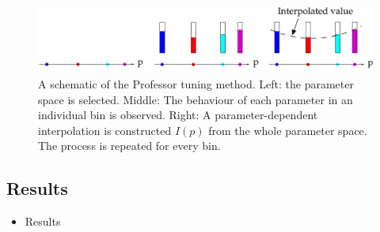 \begin{figure}[h!]
    \centering
    \includegraphics[width=\textwidth]{images/prof_schem.pdf}
    \caption{A schematic of the Professor tuning method. Left: the parameter space is selected. Middle: The behaviour of each parameter in an individual bin is observed. Right: A parameter-dependent interpolation is constructed \( I(p) \) from the whole parameter space. The process is repeated for every bin. }
    \label{fig:profSchem}
\end{figure}

\subsection{Results}
\begin{itemize}
    \item Results 
\end{itemize}



\clearpage
